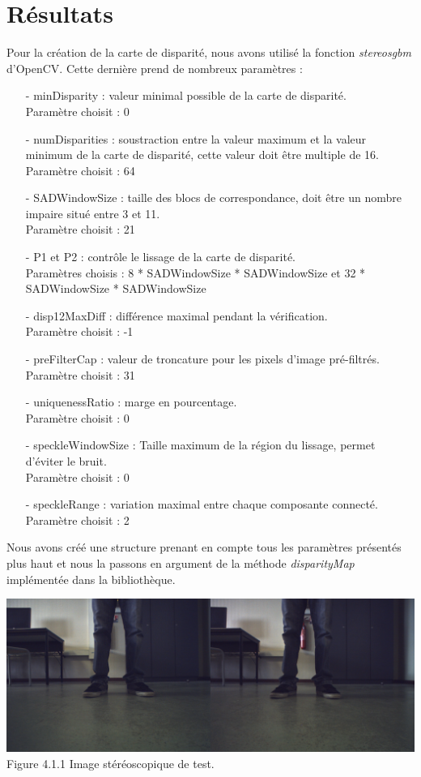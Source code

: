 \documentclass[12pt,a4paper]{report}
\begin{document}
\section{Résultats}
Pour la création de la carte de disparité, nous avons utilisé la fonction \textit{stereosgbm} d'OpenCV. Cette dernière prend de nombreux paramètres : 
\begin{enumerate}
\item[-] minDisparity : valeur minimal possible de la carte de disparité.\\
Paramètre choisit : 0
\item[-] numDisparities : soustraction entre la valeur maximum et la valeur minimum de la carte de disparité, cette valeur doit être multiple de 16.\\
Paramètre choisit : 64
\item[-] SADWindowSize : taille des blocs de correspondance, doit être un nombre impaire situé entre 3 et 11.\\
Paramètre choisit : 21
\item[-] P1 et P2 : contrôle le lissage de la carte de disparité.\\
Paramètres choisis : 8 * SADWindowSize * SADWindowSize et 32 * SADWindowSize * SADWindowSize
\item[-] disp12MaxDiff : différence maximal pendant la vérification.\\
Paramètre choisit : -1
\item[-] preFilterCap : valeur de troncature pour les pixels d'image pré-filtrés.\\
Paramètre choisit : 31
\item[-] uniquenessRatio : marge en pourcentage.\\
Paramètre choisit : 0
\item[-] speckleWindowSize : Taille maximum de la région du lissage, permet d'éviter le bruit.\\
Paramètre choisit : 0
\item[-] speckleRange : variation maximal entre chaque composante connecté.
Paramètre choisit : 2
\end{enumerate}

Nous avons créé une structure prenant en compte tous les paramètres présentés plus haut et nous la passons en argument de la méthode \textit{disparityMap} implémentée dans la bibliothèque.\\

\begin{center}
		\includegraphics[scale=0.32]{img_0.png}\\
		Figure 4.1.1 Image stéréoscopique de test.
\end{center}
\end{document}

